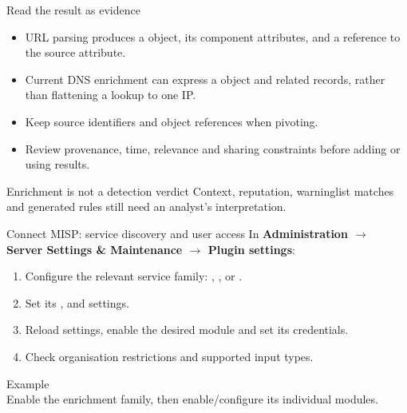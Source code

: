 \begin{frame}{Read the result as evidence}
    \begin{itemize}
        \item URL parsing produces a  object, its component attributes,
        and a reference to the source attribute.
        \item Current DNS enrichment can express a  object and
        related records, rather than flattening a lookup to one IP.
        \item Keep source identifiers and object references when pivoting.
        \item Review provenance, time, relevance and sharing constraints before
        adding or using results.
    \end{itemize}
    \begin{block}{Enrichment is not a detection verdict}
        Context, reputation, warninglist matches and generated rules still need
        an analyst's interpretation.
    \end{block}
\end{frame}

\begin{frame}{Connect MISP: service discovery and user access}
    \small
    In \textbf{Administration $\rightarrow$ Server Settings \& Maintenance
    $\rightarrow$ Plugin settings}:
    \begin{enumerate}
        \item Configure the relevant service family: ,
        ,  or .
        \item Set its ,  and
         settings.
        \item Reload settings, enable the desired module and set its credentials.
        \item Check organisation restrictions and supported input types.
    \end{enumerate}
    \begin{block}{Example}
        \\
        Enable the enrichment family, then enable/configure its individual modules.
    \end{block}
\end{frame}

